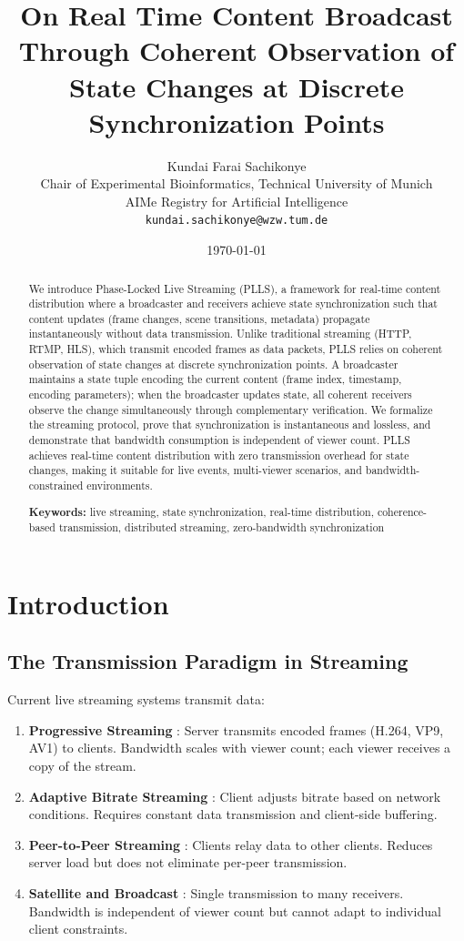 \documentclass[twocolumn,10pt,a4paper]{article}
\title{\textbf{On Real Time Content Broadcast Through Coherent Observation of State Changes at Discrete Synchronization Points}}
\author{Kundai Farai Sachikonye\\
\small Chair of Experimental Bioinformatics, Technical University of Munich\\
\small AIMe Registry for Artificial Intelligence\\
\small \texttt{kundai.sachikonye@wzw.tum.de}}
\date{\today}
\theoremstyle{plain}
\theoremstyle{definition}
\providecommand{\keywords}[1]{\par\medskip\noindent\textbf{Keywords:} #1}
\begin{document}
\maketitle

\begin{abstract}
We introduce Phase-Locked Live Streaming (PLLS), a framework for real-time content distribution where a broadcaster and receivers achieve state synchronization such that content updates (frame changes, scene transitions, metadata) propagate instantaneously without data transmission. Unlike traditional streaming (HTTP, RTMP, HLS), which transmit encoded frames as data packets, PLLS relies on coherent observation of state changes at discrete synchronization points. A broadcaster maintains a state tuple encoding the current content (frame index, timestamp, encoding parameters); when the broadcaster updates state, all coherent receivers observe the change simultaneously through complementary verification. We formalize the streaming protocol, prove that synchronization is instantaneous and lossless, and demonstrate that bandwidth consumption is independent of viewer count. PLLS achieves real-time content distribution with zero transmission overhead for state changes, making it suitable for live events, multi-viewer scenarios, and bandwidth-constrained environments.

\keywords{live streaming, state synchronization, real-time distribution, coherence-based transmission, distributed streaming, zero-bandwidth synchronization}
\end{abstract}

\section{Introduction}

\subsection{The Transmission Paradigm in Streaming}

Current live streaming systems transmit data:
\begin{enumerate}
\item \textbf{Progressive Streaming} \cite{kurose2012computer}: Server transmits encoded frames (H.264, VP9, AV1) to clients. Bandwidth scales with viewer count; each viewer receives a copy of the stream.
\item \textbf{Adaptive Bitrate Streaming} \cite{stockhausen2016http}: Client adjusts bitrate based on network conditions. Requires constant data transmission and client-side buffering.
\item \textbf{Peer-to-Peer Streaming} \cite{khan2012peer}: Clients relay data to other clients. Reduces server load but does not eliminate per-peer transmission.
\item \textbf{Satellite and Broadcast} \cite{strang1998terrestrial}: Single transmission to many receivers. Bandwidth is independent of viewer count but cannot adapt to individual client constraints.
\end{enumerate}
\end{document}
